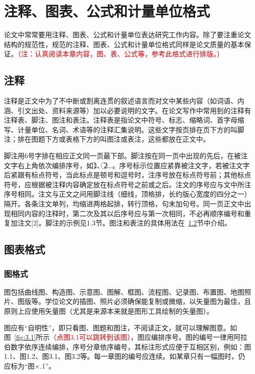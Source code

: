 \chapter{注释、图表、公式和计量单位格式}
论文中常常要用注释、图表、公式和计量单位表达研究工作内容。除了要注重论文结构的规范性，规范的注释、图表、公式和计量单位格式同样是论文质量的基本保证。\textcolor{red}{（注：认真阅读本章内容，图、表、公式等，参考此格式进行排版。）}
\section{注释}
注释是正文中为了不中断或割离连贯的叙述语言而对文中某些内容（如词语、内涵、引文出处、资料来源等）加以必要说明的文字。在论文写作中常用到的注释有注释表、脚注、图注和表注。注释表是指论文中符号、标志、缩略词、首字母缩写、计量单位、名词、术语等的注释汇集说明。这些文字按页排在页下方的叫脚注；排在图题下方或表格下方的叫图注或表注，这些都放在正文中。

脚注用6号字排在相应正文同一页最下部。脚注按在同一页中出现的先后，在被注文字右上角依次编排序号，如\textcircled{1}、\textcircled{2}…。序号标示位置应紧靠被注文字，若被注文字后紧跟有标点符号，当此标点是顿号和逗号时，注序号放在标点符号前；其他标点符号，应根据被注释内容确定放在标点符号之前或之后。注文的序号应与文中所注序号相同。注文与正文之间用脚注线（细线，顶格排，长约版心宽度的四分之一）隔开。各条注文单列，均缩进两格起排，转行顶格，句末加句号。同一页正文中出现相同内容的注释时，第二次及其以后序号应与第一次相同，不必再顺序编号和重复加注文[2]。脚注的示例见1.3节。图注和表注的具体用法在~\ref{section:3.2}节中介绍。



\section{图表格式}
\label{section:3.2} %
\subsection{图格式}
图包括曲线图、构造图、示意图、图解、框图、流程图、记录图、布置图、地图照片、图版等。学位论文的插图、照片必须确保能复制或微缩，以矢量图为最佳，且原则上应使用矢量图（尤其是来源本来就是图形工具绘制的矢量图）。

图应有“自明性”，即只看图、图题和图注，不阅读正文，就可以理解图意。如图~\ref{fig:3.1}所示\textcolor{red}{（点图3.1可以跳转到该图）}，图应编排序号。图的编号一律用阿拉伯数字依序连续编排，序号分章依序编号，其标注形式应便于互相区别，例如：图1.1、图1.2、图3.1、图3.2等。每一章图的编号应连续。如某章只有一幅图时，仍应标为“图×.1”。

